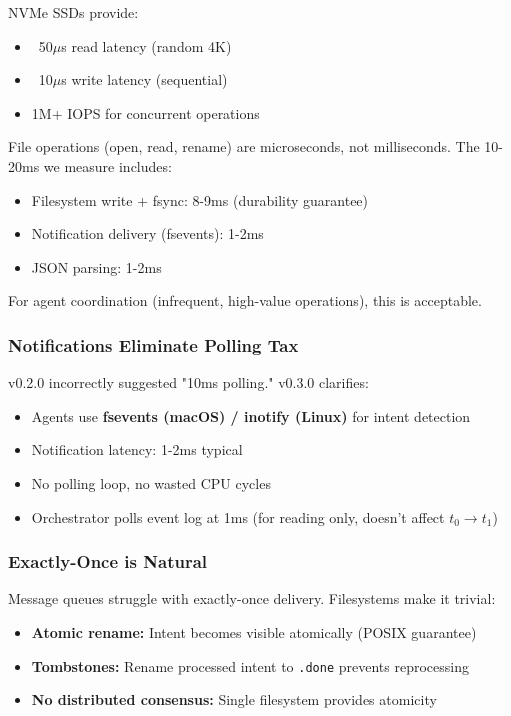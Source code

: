 \documentclass[11pt]{article}
\begin{document}
NVMe SSDs provide:
\begin{itemize}
\item ~50$\mu$s read latency (random 4K)
\item ~10$\mu$s write latency (sequential)
\item 1M+ IOPS for concurrent operations
\end{itemize}

File operations (open, read, rename) are microseconds, not milliseconds. The 10-20ms we measure includes:
\begin{itemize}
\item Filesystem write + fsync: 8-9ms (durability guarantee)
\item Notification delivery (fsevents): 1-2ms
\item JSON parsing: 1-2ms
\end{itemize}

For agent coordination (infrequent, high-value operations), this is acceptable.

\subsubsection{Notifications Eliminate Polling Tax}

v0.2.0 incorrectly suggested "10ms polling." v0.3.0 clarifies:
\begin{itemize}
\item Agents use \textbf{fsevents (macOS) / inotify (Linux)} for intent detection
\item Notification latency: 1-2ms typical
\item No polling loop, no wasted CPU cycles
\item Orchestrator polls event log at 1ms (for reading only, doesn't affect $t_0 \rightarrow t_1$)
\end{itemize}

\subsubsection{Exactly-Once is Natural}

Message queues struggle with exactly-once delivery. Filesystems make it trivial:
\begin{itemize}
\item \textbf{Atomic rename:} Intent becomes visible atomically (POSIX guarantee)
\item \textbf{Tombstones:} Rename processed intent to \texttt{.done} prevents reprocessing
\item \textbf{No distributed consensus:} Single filesystem provides atomicity
\end{itemize}
\end{document}
